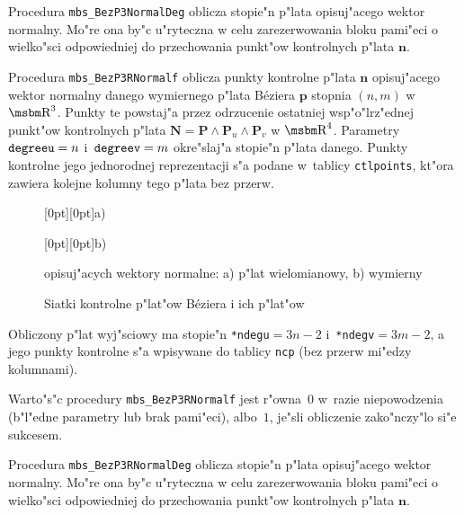 \vspace{\smallskipamount}
Procedura \texttt{mbs\_BezP3NormalDeg} oblicza stopie"n p"lata opisuj"acego
wektor normalny. Mo"re ona by"c u"ryteczna w celu zarezerwowania
bloku pami"eci o wielko"sci odpowiedniej do przechowania punkt"ow
kontrolnych p"lata $\bm{n}$.


\vspace{\bigskipamount}
Procedura \texttt{mbs\_BezP3RNormalf} oblicza
punkty kontrolne p"lata $\bm{n}$ opisuj"acego wektor normalny danego
wymiernego p"lata B\'{e}ziera $\bm{p}$ stopnia $(n,m)$ w~$\R^3$.
Punkty te powstaj"a przez odrzucenie ostatniej wsp"o"lrz"ednej punkt"ow
kontrolnych p"lata $\bm{N}=\bm{P}\wedge\bm{P}_u\wedge\bm{P}_v$ w $\R^4$.
Parametry $\mathord{\mbox{\texttt{degreeu}}}=n$
i~$\mathord{\mbox{\texttt{degreev}}}=m$ okre"slaj"a stopie"n
p"lata danego. Punkty kontrolne jego jednorodnej reprezentacji s"a podane
w~tablicy \texttt{ctlpoints}, kt"ora zawiera kolejne kolumny tego p"lata
bez przerw.

\begin{figure}[ht]
  \centerline{\raisebox{90pt}[0pt][0pt]{a)}}
  \centerline{\raisebox{96pt}[0pt][0pt]{b)}}
  \caption{Siatki kontrolne p"lat"ow B\'{e}ziera i ich p"lat"ow}
  \centerline{opisuj"acych wektory normalne: a) p"lat wielomianowy, b) wymierny}
\end{figure}
Obliczony p"lat wyj"sciowy ma stopie"n \texttt{*ndegu}$=3n-2$
i~\texttt{*ndegv}$=3m-2$, a jego punkty kontrolne s"a wpisywane do tablicy
\texttt{ncp} (bez przerw mi"edzy kolumnami).

Warto"s"c procedury \texttt{mbs\_BezP3RNormalf} jest r"owna~$0$ w~razie
niepowodzenia (b"l"edne parametry lub brak pami"eci), albo~$1$, je"sli
obliczenie zako"nczy"lo si"e sukcesem.

\vspace{\smallskipamount}
Procedura \texttt{mbs\_BezP3RNormalDeg} oblicza stopie"n p"lata opisuj"acego
wektor normalny. Mo"re ona by"c u"ryteczna w celu zarezerwowania
bloku pami"eci o wielko"sci odpowiedniej do przechowania punkt"ow
kontrolnych p"lata $\bm{n}$.


